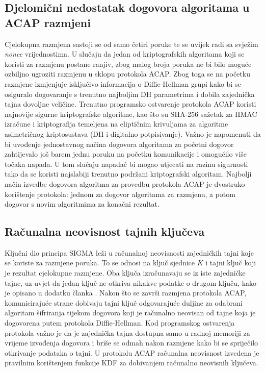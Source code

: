 \subsection{Djelomični nedostatak dogovora algoritama u ACAP razmjeni}
Cjelokupna razmjena sastoji se od samo četiri poruke te se uvijek radi sa svježim
\emph{nonce} vrijednostima. U slučaju da jedan od kriptografskih algoritama
koji se koristi
za razmjenu postane ranjiv, zbog malog broja poruka ne bi bilo moguće
ozbiljno ugroziti razmjenu u sklopu protokola ACAP. Zbog toga se na početku
razmjene izmjenjuje isključivo informacija o Diffie-Hellman grupi kako bi se
osiguralo dogovaranje s trenutno najboljim DH parametrima i dobila zajednička
tajna dovoljne veličine. Trenutno programsko ostvarenje protokola ACAP koristi
najnovije sigurne kriptografske algoritme, kao što su SHA-256
sažetak za HMAC izračune i kriptografija temeljena na eliptičnim krivuljama za
algoritme asimetričnog kriptosustava (DH i digitalno potpisivanje). Važno je
napomenuti da bi uvođenje jednostavnog načina dogovora algoritama za početni
dogovor zahtijevalo još barem jednu poruku na početku komunikacije i
omogućilo više točaka napada. U tom slučaju napadač bi mogao utjecati na razinu
sigurnosti tako da se koristi najslabiji trenutno podržani kriptografski
algoritam. Najbolji način izvedbe dogovora algoritma za provedbu protokola ACAP
je dvostruko korištenje protokola: jednom za dogovor algoritama za razmjenu, a
potom dogovor s novim algoritmima za konačni rezultat.

\subsection{Računalna neovisnost tajnih ključeva}
\label{sec:keys}
Ključni dio principa SIGMA leži u
računalnoj neovisnosti zajedničkih tajni koje se koriste za razmjene poruka. To
se odnosi na ključ sjednice $K$ i tajni ključ koji je rezultat cjelokupne
razmjene. Oba ključa izračunavaju se iz iste zajedničke tajne, uz uvjet da jedan
ključ ne otkriva nikakve podatke o drugom ključu, kako je opisano u
dodatku članka \cite{Krawczyk2003sigma}. Nakon što se završi razmjena protokola
ACAP, komunicirajuće strane dobivaju tajni ključ odgovarajuće duljine
za odabrani algoritam šifriranja  tijekom dogovora koji je računalno neovisan od
tajne koja je dogovorena putem protokola Diffie-Hellman. Kod programskog
ostvarenja protokola važno je da je zajednička tajna
dostupna samo u radnoj memoriji za vrijeme izvođenja dogovora i briše se odmah
nakon
razmjene kako bi se spriječilo otkrivanje podataka o tajni. U protokolu ACAP
računalna neovisnost izvedena je pravilnim korištenjem funkcije KDF za
dobivanjem računalno neovisnih ključeva.

